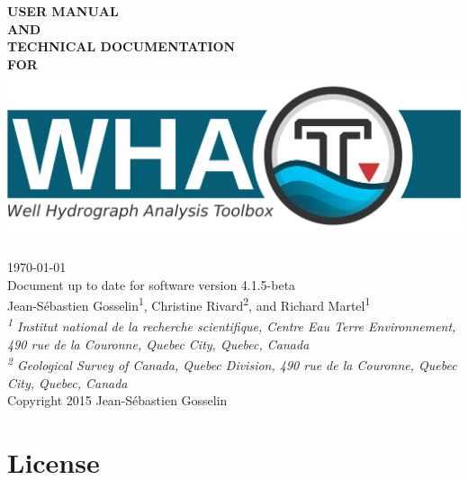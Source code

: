 \documentclass[12pt, letterpaper, fleqn]{report}
\begin{document}
\begin{titlepage}
\begin{center}


\textbf{\fontsize{30}{36}\selectfont USER MANUAL}\\[1.0cm]
\textbf{\fontsize{30}{36}\selectfont AND}\\[1.0cm]
\textbf{\fontsize{30}{36}\selectfont TECHNICAL DOCUMENTATION}\\[1.0cm]
\textbf{\fontsize{30}{36}\selectfont FOR}\\

\includegraphics[width=1\textwidth]{WHAT_banner}~\\[2cm]

{\Large \today}\\[0.5cm]
{\Large Document up to date for software version 4.1.5-beta}\\[2cm]

{\large Jean-S\'ebastien Gosselin\textsuperscript{1}, Christine Rivard\textsuperscript{2}, and Richard Martel\textsuperscript{1}}\\[0.25cm]

\textit{{\small\textsuperscript{1} Institut national de la recherche scientifique, Centre Eau Terre Environnement, 490 rue de la Couronne, Quebec City, Quebec, Canada}}\\[0.1cm]

\textit{{\small\textsuperscript{2} Geological Survey of Canada, Quebec Division, 490 rue de la Couronne, Quebec City, Quebec, Canada}}\\[2cm]

{Copyright 2015 Jean-S\'ebastien Gosselin}

\end{center}
\end{titlepage}


\chapter*{License}
\end{document}
